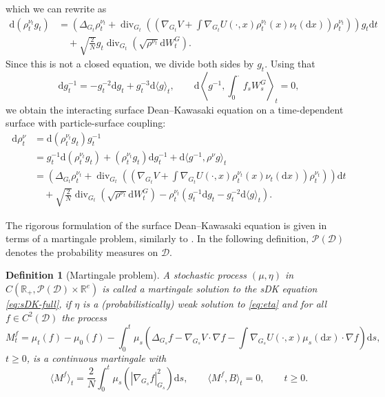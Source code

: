 \documentclass[11pt, a4paper]{article}
\newcommand{\cdummy}{\cdot}
\newcommand{\mathd}{\mathrm{d}}
\newcommand{\tmop}[1]{\ensuremath{\operatorname{#1}}}
\newtheorem{definition}[theorem]{Definition}
\begin{document}
which we can rewrite as
\begin{align*}
    \mathd (\rho^{\nu_t}_t g_t) & = \left( \Delta_{G_t} \rho^{\nu_t}_t +
   \tmop{div}_{G_t} \left( \left( \nabla_{G_t} V + \int \nabla_{G_t} U
   (\cdummy, x) \rho^{\nu_t}_t (x) \nu_t (\mathd x) \right) \rho^{\nu_t}_t
   \right) \right) g_t \mathd t \\
   &\quad + \sqrt{\frac2N} g_t \tmop{div}_{G_t} \left(
   \sqrt{\rho^{\nu_t}} \mathd W^G_t \right) .
\end{align*}
Since this is not a closed equation,  we  divide both sides by $g_t$. Using that
\[ \mathd g_t^{- 1} = - g_t^{- 2} \mathd g_t + g_t^{- 3} \mathd \langle g
   \rangle_t, \qquad \mathd \left\langle g^{- 1}, \int_0^{\cdummy} f_s W^G_s
   \right\rangle_t = 0, \]
we obtain the interacting surface Dean--Kawasaki equation on a time-dependent surface with particle-surface coupling:
\begin{align} \nonumber
  \mathd \rho^\nu_t & = \mathd (\rho^{\nu_t}_t g_t) g_t^{- 1}\\ \nonumber
  & = g_t^{- 1} \mathd (\rho^{\nu_t}_t
  g_t) + (\rho^{\nu_t}_t g_t) \mathd g_t^{- 1} + \mathd \langle g^{- 1},
  \rho^{\nu} g \rangle_t\\ \nonumber
  & = \left( \Delta_{G_t} \rho^{\nu_t}_t + \operatorname{div}_{G_t} \left(
  \left( \nabla_{G_t} V + \int \nabla_{G_t} U (\cdummy, x) \rho^{\nu_t}_t (x)
  \nu_t (\mathd x) \right) \rho^{\nu_t}_t \right) \right) \mathd t \\
  & \quad + \sqrt{\frac2N}\operatorname{div}_{G_t} \left( \sqrt{\rho^{\nu_t}} \mathd W^G_t \right)
   - \rho^{\nu_t}_t (g_t^{- 1} \mathd g_t - g_t^{- 2} \mathd \langle g \label{eq:sDK-full}
  \rangle_t) .
\end{align}


The rigorous formulation of the surface Dean--Kawasaki equation is given in terms of a martingale problem, similarly to \cite{konarovskyi2020dean,Konarovskyi}. In the following definition, $\mathcal{P}(\mathcal{D})$ denotes the probability measures on $\mathcal{D}$.

\begin{definition}[Martingale problem]\label{def:sDK-martingale-problem}
  A stochastic process $(\mu, \eta)$ in $C (\mathbb{R}_+, \mathcal{P} (\mathcal{D})
  \times \mathbb{R}^e)$ is called a martingale solution to the
  sDK equation \eqref{eq:sDK-full}, if $\eta$ is a (probabilistically) weak  solution to \eqref{eq:eta}
  and for all $f \in C^2 (\mathcal{D})$ the process
  \[ M^f_t = \mu_t (f) - \mu_0 (f) - \int_0^t \mu_s \left( \Delta_{G_s} f -
     \nabla_{G_s} V \cdummy \nabla f - \int \nabla_{G_s} U (\cdummy, x) \mu_s
     (\mathd x) \cdummy \nabla f \right) \mathd s, \]
  $t\ge 0$, is a continuous martingale with
  \[ \langle M^f \rangle_t = \frac{2}{N} \int_0^t \mu_s (| \nabla_{G_s} f
     |_{G_s}^2) \mathd s, \qquad \langle M^f, B \rangle_t = 0, \qquad t
     \geq 0. \]
\end{definition}
\end{document}
